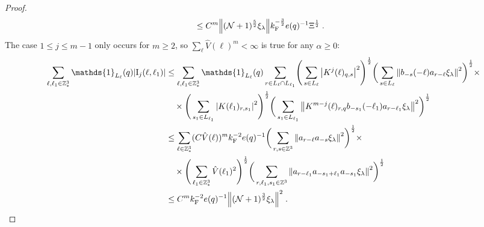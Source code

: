 \documentclass[12pt,a4paper]{article}
\numberwithin{equation}{section}
\newcommand{\1}{\mathbb{I}}
\newcommand{\F}{\mathrm{F}}
\newcommand{\I}{\mathrm{I}}
\newcommand{\Z}{\mathbb{Z}}
\newcommand{\NN}{\mathcal{N}}
\newcommand{\half}{\frac{1}{2}}
\theoremstyle{plain}
\theoremstyle{definition}
\theoremstyle{remark}
\theoremstyle{plain}
\theoremstyle{definition}
\theoremstyle{remark}
\begin{document}
\begin{proof}
\begin{align}
 	&\leq C^m \norm{ (\NN+1)^{\frac 52}\xi_\lambda}
 		k_{\F}^{-\frac 32} e(q)^{-1} \Xi^{\half} \;. \label{eq:estEQ2111} 
\end{align}
The case $ 1 \le j \le m-1 $ only occurs for $ m \ge 2 $, so $ \sum_\ell \hat{V}(\ell)^m < \infty $ is true for any $ \alpha \ge 0 $:
\begin{align}
	\sum_{\ell,\ell_1 \in \Z^3_*} \mathds{1}_{L_\ell}(q) |\I_j(\ell, \ell_1)|
	&\leq \sum_{\ell,\ell_1 \in \Z^3_*} \mathds{1}_{L_\ell}(q) \sum\limits_{r\in L_{\ell} \cap L_{\ell_1}}\! \Bigg( \sum\limits_{s \in L_\ell} \abs{K^{j}(\ell)_{q,s}}^2\Bigg)^\half \bigg( \sum\limits_{s \in L_\ell}\norm{b_{-s}(-\ell) a_{r-\ell} \xi_\lambda}^2\bigg)^\half \times\nonumber\\
		&\quad \times \Bigg( \sum\limits_{s_1 \in L_{\ell_1}}\abs{K(\ell_1)_{r,s_1}}^2\Bigg)^\half \bigg(\sum\limits_{s_1 \in L_{\ell_1}}\norm{ K^{m-j}(\ell)_{r,q} b_{-s_1}(-\ell_1)  a_{r-\ell_1} \xi_\lambda }^2\bigg)^\half
	\nonumber\\
	&\leq \sum_{\ell \in \Z^3_*} (C \hat{V}(\ell))^m
		k_{\F}^{-2} e(q)^{-1}
		\bigg( \sum\limits_{r, s\in \Z^3} \norm{ a_{r-\ell} a_{-s} \xi_\lambda}^2\bigg)^\half \times \nonumber\\
		&\quad \times 
		\Bigg( \sum_{\ell_1 \in \Z^3_*} \hat{V}(\ell_1)^2 \Bigg)^{\half}
	\bigg(
		\sum\limits_{r, \ell_1, s_1 \in \Z^3} \norm{ a_{r-\ell_1} a_{-s_1 + \ell_1} a_{-s_1} \xi_\lambda }^2\bigg)^\half
	\nonumber\\
	&\leq C^m k_{\F}^{-2} e(q)^{-1}
	\norm{ (\NN+1)^{\frac 32} \xi_\lambda}^2 \;. \label{eq:estEQ2112_Coulomb}
\end{align}

\end{proof}
\end{document}
